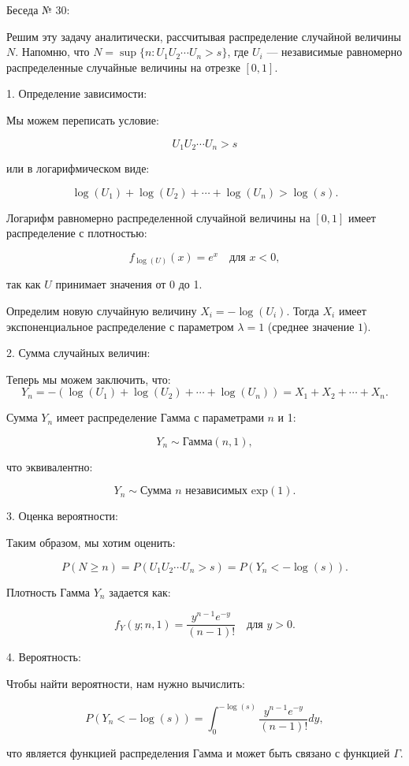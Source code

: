 \documentclass{article}
\begin{document}
Беседа № 30:

Решим эту задачу аналитически, рассчитывая распределение случайной величины \( N \). Напомню, что \( N = \sup \{ n : U_1 U_2 \cdots U_n > s \} \), где \( U_i \) — независимые равномерно распределенные случайные величины на отрезке \([0, 1]\).

1. Определение зависимости:

Мы можем переписать условие:

\[
U_1 U_2 \cdots U_n > s
\]

или в логарифмическом виде:

\[
\log(U_1) + \log(U_2) + \cdots + \log(U_n) > \log(s).
\]

Логарифм равномерно распределенной случайной величины на \([0, 1]\) имеет распределение с плотностью:

\[
f_{\log(U)}(x) = e^x \quad \text{для } x < 0,
\]

так как \( U \) принимает значения от 0 до 1.

Определим новую случайную величину \( X_i = -\log(U_i) \). Тогда \( X_i \) имеет экспоненциальное распределение с параметром \( \lambda = 1 \) (среднее значение \( 1 \)).

2. Сумма случайных величин:

Теперь мы можем заключить, что:
\[
Y_n = -(\log(U_1) + \log(U_2) + \cdots + \log(U_n)) = X_1 + X_2 + \cdots + X_n.
\]

Сумма \( Y_n \) имеет распределение Гамма с параметрами \( n \) и 1:

\[
Y_n \sim \text{Гамма}(n, 1),
\]

что эквивалентно:

\[
Y_n \sim \text{Сумма } n \text{ независимых } \text{exp}(1).
\]

3. Оценка вероятности:

Таким образом, мы хотим оценить:

\[
P(N \geq n) = P(U_1 U_2 \cdots U_n > s) = P(Y_n < -\log(s)).
\]

Плотность Гамма \( Y_n \) задается как:

\[
f_Y(y; n, 1) = \frac{y^{n-1} e^{-y}}{(n-1)!} \quad \text{для } y > 0.
\]

4. Вероятность:

Чтобы найти вероятности, нам нужно вычислить:

\[
P(Y_n < -\log(s)) = \int_0^{-\log(s)} \frac{y^{n-1} e^{-y}}{(n-1)!} dy,
\]

что является функцией распределения Гамма и может быть связано с функцией \( \Gamma \).
\end{document}
